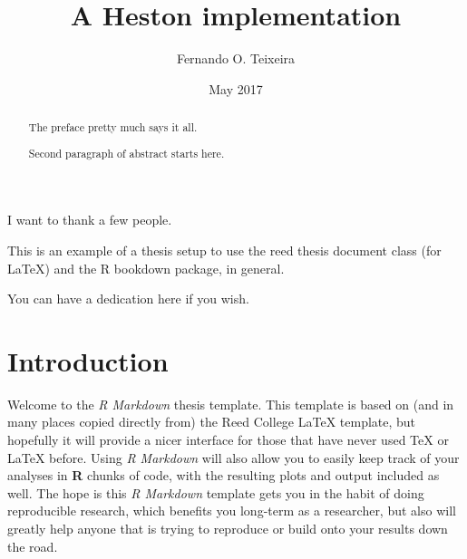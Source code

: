 \documentclass[12pt,twoside]{reedthesis}
\title{A Heston implementation}
\author{Fernando O. Teixeira}
\date{May 2017}
\theoremstyle{definition}
\theoremstyle{definition}
\theoremstyle{remark}
\begin{document}
      \maketitle
  
  \frontmatter %
  \pagestyle{empty} %

      \begin{acknowledgements}
      I want to thank a few people.
    \end{acknowledgements}
  
      \begin{preface}
      This is an example of a thesis setup to use the reed thesis document
      class (for LaTeX) and the R bookdown package, in general.
    \end{preface}
  
      \hypersetup{linkcolor=black}
    \setcounter{tocdepth}{2}
    \tableofcontents
  
      \listoftables
  
      \listoffigures
  
      \begin{abstract}
      The preface pretty much says it all. \par  Second paragraph of abstract
      starts here.
    \end{abstract}
  
      \begin{dedication}
      You can have a dedication here if you wish.
    \end{dedication}
  
  \mainmatter %
  \pagestyle{fancyplain} %

  \chapter{Introduction}\label{intro}
  
  Welcome to the \emph{R Markdown} thesis template. This template is based
  on (and in many places copied directly from) the Reed College LaTeX
  template, but hopefully it will provide a nicer interface for those that
  have never used TeX or LaTeX before. Using \emph{R Markdown} will also
  allow you to easily keep track of your analyses in \textbf{R} chunks of
  code, with the resulting plots and output included as well. The hope is
  this \emph{R Markdown} template gets you in the habit of doing
  reproducible research, which benefits you long-term as a researcher, but
  also will greatly help anyone that is trying to reproduce or build onto
  your results down the road.
  
\end{document}
